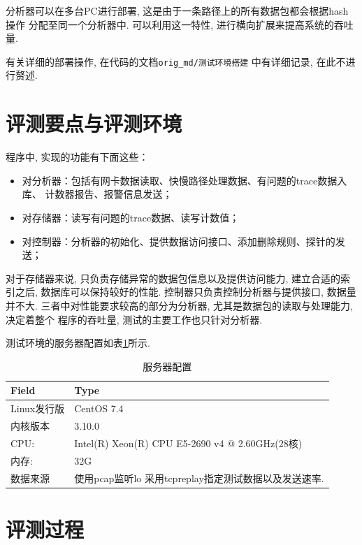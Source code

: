  分析器可以在多台PC进行部署, 这是由于一条路径上的所有数据包都会根据hash操作
分配至同一个分析器中. 可以利用这一特性, 进行横向扩展来提高系统的吞吐量.

  有关详细的部署操作, 在代码的文档\texttt{orig\_md/测试环境搭建}\cite{Niftyflow}
中有详细记录, 在此不进行赘述.

\section{评测要点与评测环境}

  程序中, 实现的功能有下面这些：

\begin{itemize}
    \item 对分析器：包括有网卡数据读取、快慢路径处理数据、有问题的trace数据入库、
计数器报告、报警信息发送；
    \item 对存储器：读写有问题的trace数据、读写计数值；
    \item 对控制器：分析器的初始化、提供数据访问接口、添加删除规则、探针的发送；
\end{itemize}

  对于存储器来说, 只负责存储异常的数据包信息以及提供访问能力, 建立合适的索引之后,
数据库可以保持较好的性能. 控制器只负责控制分析器与提供接口, 数据量并不大.
三者中对性能要求较高的部分为分析器, 尤其是数据包的读取与处理能力, 决定着整个
程序的吞吐量, 测试的主要工作也只针对分析器.


测试环境的服务器配置如表\ref{tbl:server_config}所示.

\begin{table}[]
    \centering
    \caption{服务器配置}
    \label{tbl:server_config}
    \begin{tabular}{ll} \hline
    Field    & Type          \\ \hline
    Linux发行版 & CentOS 7.4 \\
    内核版本   &   3.10.0 \\
    CPU:     & Intel(R) Xeon(R) CPU E5-2690 v4 @ 2.60GHz(28核) \\
    内存:    & 32G                                       \\
    数据来源 & 使用pcap监听lo 采用tcpreplay指定测试数据以及发送速率. \\ \hline
    \end{tabular}
\end{table}


\section{评测过程}

